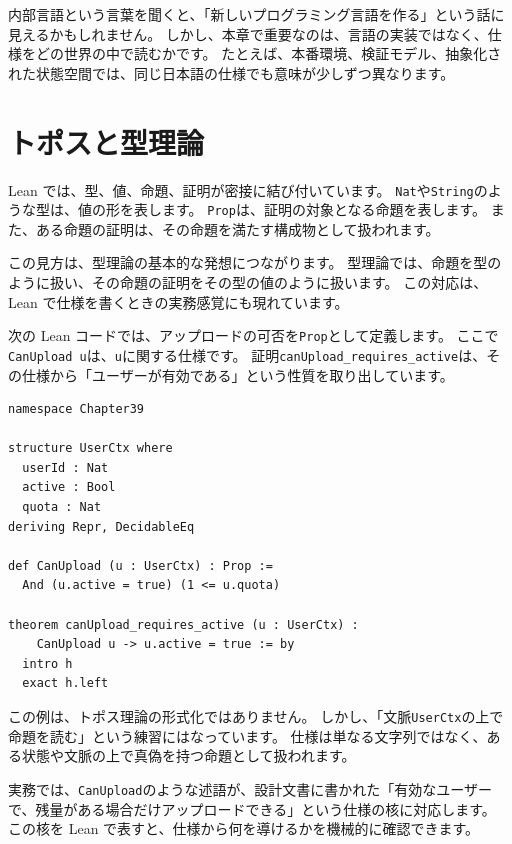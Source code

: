 内部言語という言葉を聞くと、「新しいプログラミング言語を作る」という話に見えるかもしれません。
しかし、本章で重要なのは、言語の実装ではなく、仕様をどの世界の中で読むかです。
たとえば、本番環境、検証モデル、抽象化された状態空間では、同じ日本語の仕様でも意味が少しずつ異なります。

\section{トポスと型理論}

Lean では、型、値、命題、証明が密接に結び付いています。
\texttt{Nat}や\texttt{String}のような型は、値の形を表します。
\texttt{Prop}は、証明の対象となる命題を表します。
また、ある命題の証明は、その命題を満たす構成物として扱われます。

この見方は、型理論の基本的な発想につながります。
型理論では、命題を型のように扱い、その命題の証明をその型の値のように扱います。
この対応は、Lean で仕様を書くときの実務感覚にも現れています。

次の Lean コードでは、アップロードの可否を\texttt{Prop}として定義します。
ここで\texttt{CanUpload u}は、\texttt{u}に関する仕様です。
証明\texttt{canUpload\_requires\_active}は、その仕様から「ユーザーが有効である」という性質を取り出しています。

\begin{listing}[htbp]
\begin{verbatim}
namespace Chapter39

structure UserCtx where
  userId : Nat
  active : Bool
  quota : Nat
deriving Repr, DecidableEq

def CanUpload (u : UserCtx) : Prop :=
  And (u.active = true) (1 <= u.quota)

theorem canUpload_requires_active (u : UserCtx) :
    CanUpload u -> u.active = true := by
  intro h
  exact h.left
\end{verbatim}
\caption{\texttt{CanUpload}・\texttt{canUpload\_requires\_active}}
\label{lst:ch39_user_policy}
\end{listing}

この例は、トポス理論の形式化ではありません。
しかし、「文脈\texttt{UserCtx}の上で命題を読む」という練習にはなっています。
仕様は単なる文字列ではなく、ある状態や文脈の上で真偽を持つ命題として扱われます。

実務では、\texttt{CanUpload}のような述語が、設計文書に書かれた「有効なユーザーで、残量がある場合だけアップロードできる」という仕様の核に対応します。
この核を Lean で表すと、仕様から何を導けるかを機械的に確認できます。

